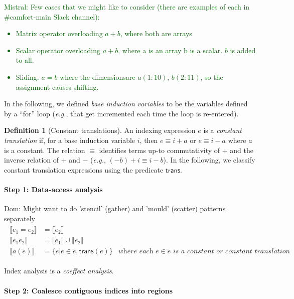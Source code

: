 \documentclass[9pt]{sigplanconf}
\newcommand{\dnote}[1]{\textcolor{darkpurple}{Dom: #1}}
\newcommand{\mnote}[1]{\textcolor{darkgreen}{Mistral: #1}}
\newcounter{block}
\theoremstyle{definition}
\newtheorem{definition}[block]{Definition}
\newcommand{\eg}{\emph{e.g.}}
\newcommand{\interp}[1]{\llbracket{#1}\rrbracket}
\begin{document}
\mnote{Few cases that we might like to consider (there are examples
    of each in \#camfort-main Slack channel):
  \begin{itemize}
    \item Matrix operator overloading $a + b$, where both are arrays
    \item Scalar operator overloading $a + b$, where a is an array b is a
      scalar. $b$ is added to all.
    \item Sliding. $a = b$ where the dimensionsare $a(1:10)$, $b(2:11)$,
      so the assignment causes shifting.
  \end{itemize}
}

In the following, we defined
\emph{base induction variables} to be the variables
 defined by a ``for'' loop (\eg{}, that get incremented each time the
loop is re-entered).

\begin{definition}[Constant translations]
An indexing expression $e$ is a \emph{constant translation} if,
for a base induction variable $i$, then $e \equiv i + a$ or $e \equiv i - a$
where $a$ is a constant. The relation $\equiv$ identifies terms
up-to commutativity of $+$ and the inverse
relation of $+$ and $-$ (\eg{}, $(-b) + i \equiv i - b$).
In the following, we classify constant translation expressions
using the predicate $\textsf{trans}$.
\end{definition}

\paragraph{Step 1: Data-access analysis}

\dnote{Might want to do 'stencil' (gather) and 'mould' (scatter)
  patterns separately}
\begin{align*}
\begin{array}{lll}
\interp{e_1 = e_2}    & = \interp{e_2} \\
\interp{e_1 e_2}      & = \interp{e_1} \cup \interp{e_2} \\
\interp{a(\tilde{e})} & = \{e | e \in \tilde{e}, \textsf{trans}(e)\} & \textit{where each $e \in
                                          \tilde{e}$ is a constant or constant translation}
\end{array}
\end{align*}

Index analysis is a \emph{coeffect analysis}.

\paragraph{Step 2: Coalesce contiguous indices into regions}
\end{document}
